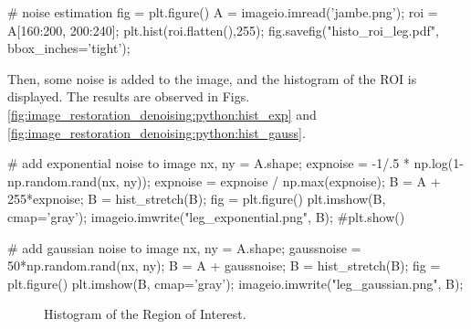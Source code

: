 \begin{python}
# noise estimation
fig = plt.figure()
A = imageio.imread('jambe.png');
roi = A[160:200, 200:240];
plt.hist(roi.flatten(),255);
fig.savefig("histo_roi_leg.pdf", bbox_inches='tight');
\end{python}

Then, some noise is added to the image, and the histogram of the ROI is displayed. The results are observed in Figs.\ref{fig:image_restoration_denoising:python:hist_exp} and \ref{fig:image_restoration_denoising:python:hist_gauss}.
\begin{python}
# add exponential noise to image
nx, ny = A.shape;
expnoise = -1/.5 * np.log(1-np.random.rand(nx, ny));
expnoise = expnoise / np.max(expnoise);
B = A + 255*expnoise;
B = hist_stretch(B);
fig = plt.figure()
plt.imshow(B, cmap='gray');
imageio.imwrite("leg_exponential.png", B);
#plt.show()
\end{python}

\begin{python}
# add gaussian noise to image
nx, ny = A.shape;
gaussnoise = 50*np.random.rand(nx, ny);
B = A + gaussnoise;
B = hist_stretch(B);
fig = plt.figure()
plt.imshow(B, cmap='gray');
imageio.imwrite("leg_gaussian.png", B);
\end{python}

\begin{figure}[H]
\centering\caption{Histogram of the Region of Interest.}%
 \hfill
{}
\vspace*{-8pt}%
 \label{fig:image_restoration_denoising:python:histogram_roi}%
\end{figure}

